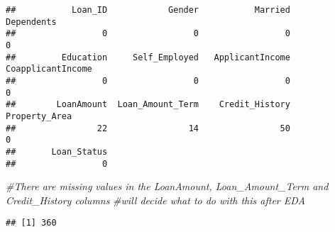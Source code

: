 \documentclass[
]{article}
\newenvironment{Shaded}{\begin{snugshade}}{\end{snugshade}}
\newcommand{\CommentTok}[1]{\textcolor[rgb]{0.56,0.35,0.01}{\textit{#1}}}
\newcommand{\ControlFlowTok}[1]{\textcolor[rgb]{0.13,0.29,0.53}{\textbf{#1}}}
\newcommand{\DecValTok}[1]{\textcolor[rgb]{0.00,0.00,0.81}{#1}}
\newcommand{\FunctionTok}[1]{\textcolor[rgb]{0.00,0.00,0.00}{#1}}
\newcommand{\NormalTok}[1]{#1}
\newcommand{\OtherTok}[1]{\textcolor[rgb]{0.56,0.35,0.01}{#1}}
\newcommand{\SpecialCharTok}[1]{\textcolor[rgb]{0.00,0.00,0.00}{#1}}
\begin{document}
\begin{verbatim}
##           Loan_ID            Gender           Married        Dependents 
##                 0                 0                 0                 0 
##         Education     Self_Employed   ApplicantIncome CoapplicantIncome 
##                 0                 0                 0                 0 
##        LoanAmount  Loan_Amount_Term    Credit_History     Property_Area 
##                22                14                50                 0 
##       Loan_Status 
##                 0
\end{verbatim}

\begin{Shaded}
\begin{Highlighting}[]
\CommentTok{\#There are missing values in the LoanAmount, Loan\_Amount\_Term and Credit\_History columns}
\CommentTok{\#will decide what to do with this after EDA}
\end{Highlighting}
\end{Shaded}

\begin{Shaded}
\end{Shaded}

\begin{verbatim}
## [1] 360
\end{verbatim}

\begin{Shaded}
\end{Shaded}
\end{document}
